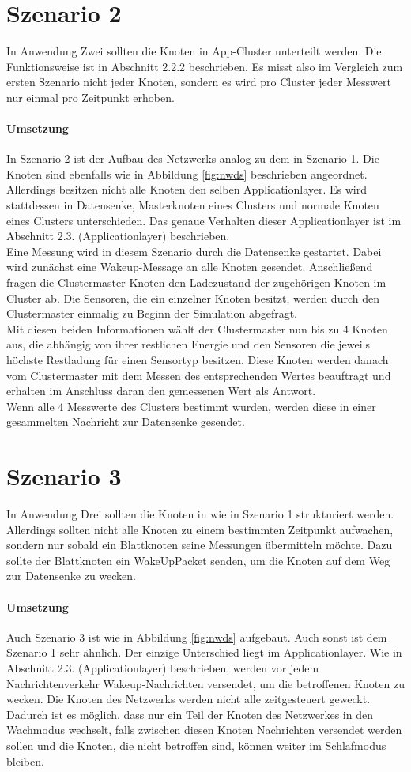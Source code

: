 \section{Szenario 2}
In Anwendung Zwei sollten die Knoten in App-Cluster unterteilt werden. Die Funktionsweise ist in Abschnitt 2.2.2 beschrieben. Es misst also im Vergleich zum ersten Szenario nicht jeder Knoten, sondern es wird pro Cluster jeder Messwert nur einmal pro Zeitpunkt erhoben.
\paragraph{Umsetzung}
In Szenario 2 ist der Aufbau des Netzwerks analog zu dem in Szenario 1. Die Knoten sind ebenfalls wie in Abbildung \ref{fig:nwds} beschrieben angeordnet. Allerdings besitzen nicht alle Knoten den selben Applicationlayer. Es wird stattdessen in Datensenke, Masterknoten eines Clusters und normale Knoten eines Clusters unterschieden. Das genaue Verhalten dieser Applicationlayer ist im Abschnitt 2.3. (Applicationlayer) beschrieben.\\
Eine Messung wird in diesem Szenario durch die Datensenke gestartet. Dabei wird zunächst eine Wakeup-Message an alle Knoten gesendet. Anschließend fragen die Clustermaster-Knoten den Ladezustand der zugehörigen Knoten im Cluster ab. Die Sensoren, die ein einzelner Knoten besitzt, werden durch den Clustermaster einmalig zu Beginn der Simulation abgefragt. \\
Mit diesen beiden Informationen wählt der Clustermaster nun bis zu 4 Knoten aus, die abhängig von ihrer restlichen Energie und den Sensoren die jeweils höchste Restladung für einen Sensortyp besitzen. Diese Knoten werden danach vom Clustermaster mit dem Messen des entsprechenden Wertes beauftragt und erhalten im Anschluss daran den gemessenen Wert als Antwort.\\
Wenn alle 4 Messwerte des Clusters bestimmt wurden, werden diese in einer gesammelten Nachricht zur Datensenke gesendet.

\section{Szenario 3}
In Anwendung Drei sollten die Knoten in wie in Szenario 1 strukturiert werden. Allerdings sollten nicht alle Knoten zu einem bestimmten Zeitpunkt aufwachen, sondern nur sobald ein Blattknoten seine Messungen übermitteln möchte. Dazu sollte der Blattknoten ein WakeUpPacket senden, um die Knoten auf dem Weg zur Datensenke zu wecken.
\paragraph{Umsetzung}
Auch Szenario 3 ist wie in Abbildung \ref{fig:nwds} aufgebaut. Auch sonst ist dem Szenario 1 sehr ähnlich. Der einzige Unterschied liegt im Applicationlayer. Wie in Abschnitt 2.3. (Applicationlayer) beschrieben, werden vor jedem Nachrichtenverkehr Wakeup-Nachrichten versendet, um die betroffenen Knoten zu wecken. Die Knoten des Netzwerks werden nicht alle zeitgesteuert geweckt. Dadurch ist es möglich, dass nur ein Teil der Knoten des Netzwerkes in den Wachmodus wechselt, falls zwischen diesen Knoten Nachrichten versendet werden sollen und die Knoten, die nicht betroffen sind, können weiter im Schlafmodus bleiben.